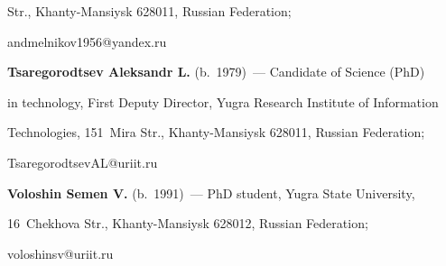 Str., Khanty-Mansiysk 628011, Russian Federation; 


\mbox{andmelnikov1956@yandex.ru} 


  


  \vspace*{3pt}


  


  \noindent


  \textbf{Tsaregorodtsev Aleksandr L.} (b.\ 1979)~--- Candidate of Science (PhD) 


in technology, First Deputy Director, Yugra Research Institute of Information 


Technologies, 151~Mira Str., Khanty-Mansiysk 628011, Russian Federation; 


\mbox{TsaregorodtsevAL@uriit.ru} 


  


  


  \vspace*{3pt}


  


  \noindent


  \textbf{Voloshin Semen V.} (b.\ 1991)~--- PhD student, Yugra State University, 


16~Chekhova Str., Khanty-Mansiysk 628012, Russian Federation; 


\mbox{voloshinsv@uriit.ru}


  


       


   


   


   


\label{end\stat}





\renewcommand{\bibname}{\protect\rm Литература}  


